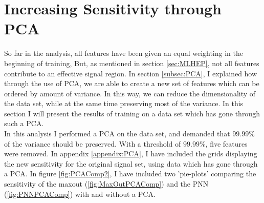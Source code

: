 \section{Increasing Sensitivity through PCA}\label{sec:PCA}
So far in the analysis, all features have been given an equal weighting in the beginning of training,
But, as mentioned in section \ref{sec:MLHEP}, not all features contribute to an effective signal 
region. In section \ref{subsec:PCA}, I explained how through the use of \ac{PCA}, we are able to 
create a new set of features which can be ordered by amount of variance. In this way, we can reduce
the dimensionality of the data set, while at the same time preserving most of the variance. In this 
section I will present the results of training on a data set which has gone through such a \ac{PCA}.
\\
In this analysis I performed a \ac{PCA} on the data set, and demanded that $99.99\%$ of the variance 
should be preserved. With a threshold of $99.99\%$, five features were removed. In appendix \ref{appendix:PCA}, I have included 
the grids displaying the new sensitivity for the original signal set, using data which has gone through a \ac{PCA}. 
In figure \ref{fig:PCAComp2}, I have included two 'pie-plots' comparing the sensitivity of the maxout (\ref{fig:MaxOutPCAComp})
and the \ac{PNN} (\ref{fig:PNNPCAComp}) with and without a \ac{PCA}.\\
